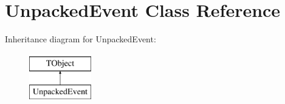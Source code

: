 \hypertarget{class_unpacked_event}{}\section{Unpacked\+Event Class Reference}
\label{class_unpacked_event}
Inheritance diagram for Unpacked\+Event\+:\begin{figure}[H]
\begin{center}
\leavevmode
\includegraphics[height=2.000000cm]{class_unpacked_event}
\end{center}
\end{figure}
